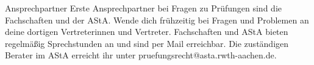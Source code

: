 \begin{artikel}{Ansprechpartner}
Erste Ansprechpartner bei Fragen zu Prüfungen sind die Fachschaften und der AStA. Wende dich frühzeitig bei Fragen und Problemen an deine dortigen Vertreterinnen und Vertreter. Fachschaften und AStA bieten regelmäßig Sprechstunden an und sind per Mail erreichbar. Die zuständigen Berater im AStA erreicht ihr unter pruefungsrecht@asta.rwth-aachen.de.
\end{artikel}
